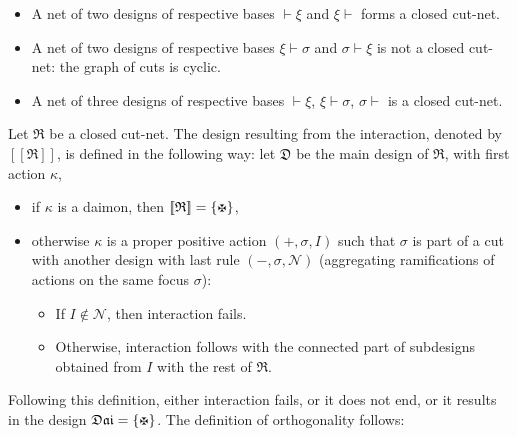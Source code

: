 \documentclass{LMCS}
\newcommand{\design}[1]{{\mathfrak{#1}}}
\newcommand{\normalisation}[1]{[\![#1]\!]}\newcommand{\psdes}[2]{[\![ #1 , #2 ]\!]}\newcommand{\proj}[2]{#1_{\downharpoonright#2}}
\newcommand{\dai}{\design{Dai}}
\begin{document}
\begin{exa}\hfill
\begin{itemize}
\item A net of two designs of respective bases $\vdash \xi$ and $\xi \vdash$ forms a closed cut-net.
\item A net of two designs of respective bases $\xi \vdash \sigma$ and $\sigma \vdash \xi$ is not a closed cut-net: the graph of cuts is cyclic.
\item A net of three designs of respective bases $\vdash \xi$, $\xi \vdash \sigma$, $\sigma \vdash$ is a closed cut-net.
\end{itemize}
\end{exa}
 
\begin{defi}
Let $\design{R}$ be a closed cut-net. 
The design resulting from the interaction, denoted by $\normalisation{\design{R}}$, is defined in the following way:
let $\design{D}$ be the main design of $\design{R}$, with first action $\kappa$,
\begin{itemize}
\item if $\kappa$ is a daimon, then $\normalisation{\design{R}} = \{\daimon\}$,
\item otherwise $\kappa$ is a proper positive action $(+,\sigma,I)$ such that $\sigma$ is part of a cut with another design with last rule $(-,\sigma, {\mathcal N})$ (aggregating ramifications of actions on the same focus $\sigma$):
	\begin{itemize}
	\item If $I \not\in \mathcal N$, then interaction fails.
	\item Otherwise, interaction follows with the connected part of subdesigns obtained from $I$ with the rest of $\design{R}$.
	\end{itemize}
\end{itemize}
\end{defi}

\noindent Following this definition, either interaction fails, or it does not end, or it results in the design $\dai = \{\daimon\}$.
The definition of orthogonality follows:
\end{document}

